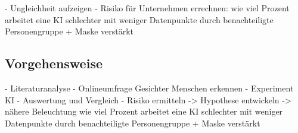 - Ungleichheit aufzeigen
- Risiko für Unternehmen errechnen: wie viel Prozent arbeitet eine KI schlechter mit weniger Datenpunkte durch benachteiligte Personengruppe + Maske verstärkt

\subsection{Vorgehensweise}
- Literaturanalyse 
- Onlineumfrage Gesichter Menschen erkennen
- Experiment KI
- Auswertung und Vergleich 
- Risiko ermitteln -> Hypothese entwickeln -> nähere Beleuchtung wie viel Prozent arbeitet eine KI schlechter mit weniger Datenpunkte durch benachteiligte Personengruppe + Maske verstärkt